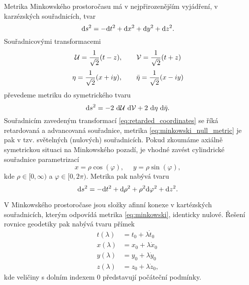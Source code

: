Metrika Minkowského prostoročasu má v nejpřirozenějším vyjádření, v karzézských souřadnicích, tvar
\begin{equation}
     \label{eq:minkowski}
     \mathrm{d} s^2 = - \mathrm{d} t^2 + \mathrm{d} x^2 + \mathrm{d} y^2 + \mathrm{d} z^2.
\end{equation}
Souřadnicovými transformacemi
\begin{equation}
     \label{eq:retarded_coordinates}
     \mathcal{U} = \frac{1}{\sqrt{2}} (t - z),~~~~~~\mathcal{V} = \frac{1}{\sqrt{2}} (t + z)
\end{equation}
\begin{equation}
     \eta = \frac{1}{\sqrt{2}} (x + iy), ~~~~~~\bar{\eta} = \frac{1}{\sqrt{2}} (x - iy)
\end{equation}
převedeme metriku do symetrického tvaru
\begin{equation}
     \label{eq:minkowski_null_metric}
     \mathrm{d} s^2 = -2 ~ \mathrm{d} \mathcal{U} ~ \mathrm{d} \mathcal{V} + 2 ~ \mathrm{d} \eta ~ \mathrm{d} \bar{\eta}.
\end{equation}
Souřadnicím zavedeným transformací \eqref{eq:retarded_coordinates} se říká retardovaná a advancovaná souřadnice,
metrika \eqref{eq:minkowski_null_metric} je pak v tzv. světelných (nulových) souřadnicích.
Pokud zkoumáme axiálně symetrickou situaci na Minkowského pozadí, je vhodné zavést cylindrické
souřadnice parametrizací
\begin{equation}
     x = \rho \cos (\varphi), ~~~~~~ y = \rho \sin (\varphi),
\end{equation}
kde $\rho \in [0, \infty)$ a $\varphi \in [0, 2\pi)$. Metrika pak nabývá tvaru
\begin{equation}
     \mathrm{d} s^2 = -\mathrm{d} t^2 + \mathrm{d} \rho^2 + \rho^2 \mathrm{d} \varphi^2 + \mathrm{d} z^2.
\end{equation}

V Minkowského prostoročase jsou složky afinní konexe v kartézských souřadnicích,
kterým odpovídá metrika \ref{eq:minkowski}, identicky nulové. Řešení rovnice geodetiky pak
nabývá tvaru přímek
\begin{equation}
     \label{eq:minkowski_cartesian_geodesics}
     \begin{split}
     t(\lambda) &= t_0 + \lambda {\dot t}_0 \\
     x(\lambda) &= x_0 + \lambda {\dot x}_0 \\
     y(\lambda) &= y_0 + \lambda {\dot y}_0 \\
     z(\lambda) &= z_0 + \lambda {\dot z}_0,
     \end{split}
\end{equation}
kde veličiny s dolním indexem $0$ představují počáteční podmínky.


